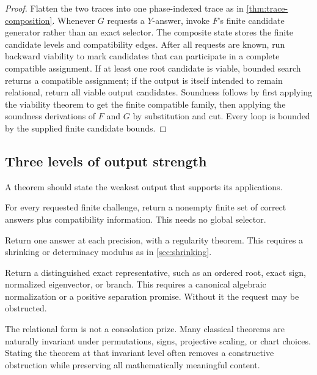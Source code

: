 \begin{proof}
Flatten the two traces into one phase-indexed trace as in
\cref{thm:trace-composition}.  Whenever \(G\) requests a \(Y\)-answer, invoke
\(F\)'s finite candidate generator rather than an exact selector.  The
composite state stores the finite candidate levels and compatibility edges.
After all requests are known, run backward viability to mark candidates that
can participate in a complete compatible assignment.  If at least one root
candidate is viable, bounded search returns a compatible assignment; if the
output is itself intended to remain relational, return all viable output
candidates.  Soundness follows by first applying the viability theorem to get
the finite compatible family, then applying the soundness derivations of
\(F\) and \(G\) by substitution and cut.  Every loop is bounded by the supplied
finite candidate bounds.
\end{proof}

\subsection{Three levels of output strength}

A theorem should state the weakest output that supports its applications.

\begin{description}[leftmargin=3.5cm,style=nextline]
\item[Relational output.] For every requested finite challenge, return a
      nonempty finite set of correct answers plus compatibility information.
      This needs no global selector.
\item[Approximate functional output.] Return one answer at each precision,
      with a regularity theorem.  This requires a shrinking or determinacy
      modulus as in \cref{sec:shrinking}.
\item[Exact selected output.] Return a distinguished exact representative,
      such as an ordered root, exact sign, normalized eigenvector, or branch.
      This requires a canonical algebraic normalization or a positive
      separation promise.  Without it the request may be obstructed.
\end{description}

The relational form is not a consolation prize.  Many classical theorems are
naturally invariant under permutations, signs, projective scaling, or chart
choices.  Stating the theorem at that invariant level often removes a
constructive obstruction while preserving all mathematically meaningful
content.

